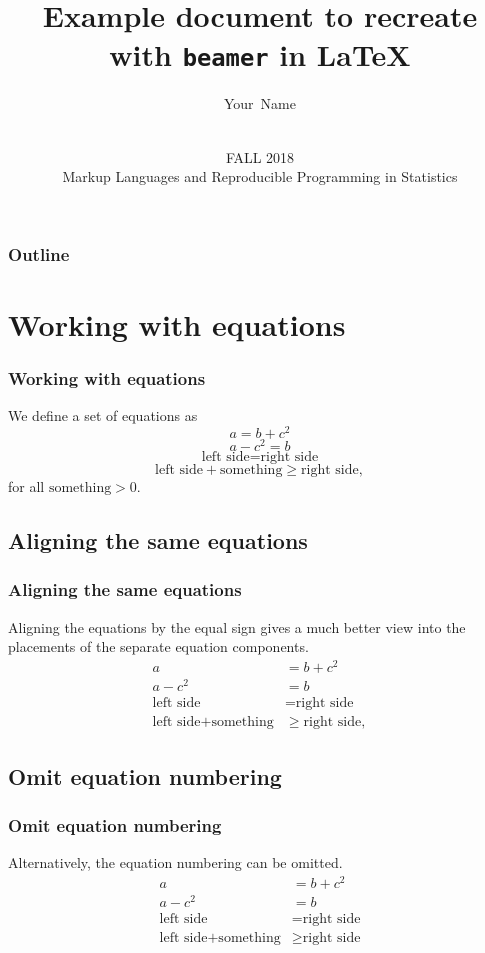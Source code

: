\documentclass[aspectratio=169]{beamer} %
\title[Example] {Example document to recreate with \texttt{beamer} in \LaTeX}
\author[Your Name]
{
 Your~Name
}
\date[MLRPS]
{\vspace{.5 in}\\ FALL 2018 \\ Markup Languages and Reproducible Programming in Statistics  \vskip6mm}
\begin{document}
\titlepage

\begin{frame}
\frametitle{Outline}
\tableofcontents
\end{frame}

\section{Working with equations}
\begin{frame}
\frametitle{Working with equations}
    We define a set of equations as
    \begin{equation}
        a=b+c^2
    \end{equation}
    \begin{equation}
    	a-c^2=b
    \end{equation}
    \begin{equation}
    	\text{left side} = \text{right side}
    \end{equation}
    \begin{equation}
    	\text{left side} + \text{something} \geq \text{right side},
    \end{equation}
    for all $\text{something} > 0$. 
\end{frame}

\subsection{Aligning the same equations}
\begin{frame}
\frametitle{Aligning the same equations}
    Aligning the equations by the equal sign gives a much better view into the placements of the separate equation components. 
    \begin{align}
    	a&=b+c^2\\
    	a-c^2&=b\\
    	\text{left side} &= \text{right side}\\
    	\text{left side} + \text{something} & \geq \text{right side},
    \end{align}
\end{frame}

\subsection{Omit equation numbering}
\begin{frame}
\frametitle{Omit equation numbering}
    Alternatively, the equation numbering can be omitted. 
    \begin{align*}
    	a&=b+c^2\\
    	a-c^2&=b\\
    	\text{left side} &= \text{right side}\\
    	\text{left side} + \text{something} & \geq \text{right side}
    \end{align*}
\end{frame}
\end{document}
